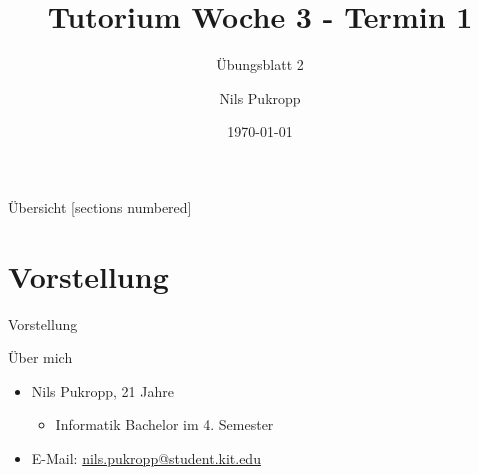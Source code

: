 \documentclass[aspectratio=169]{beamer}
\title{\color{classcolor}Tutorium Woche 3 - Termin 1}
\subtitle{Übungsblatt 2}
\date{\today}
\author{Nils Pukropp}
\institute{INSTITUT FÜR PROGRAMMSTRUKTUREN UND DATENORGANISATION}
\begin{document}
\maketitle

\begin{frame}{Übersicht}
  [sections numbered]
  \tableofcontents[hideallsubsections]
\end{frame}

\section{Vorstellung}
\begin{frame}[fragile]{Vorstellung}
  \begin{block}{Über mich}
  \begin{itemize}
    \item Nils Pukropp, 21 Jahre
    \begin{itemize}
      \item Informatik Bachelor im 4. Semester
    \end{itemize}
    \item E-Mail: \href{mailto:nils.pukropp@student.kit.edu}{nils.pukropp@student.kit.edu}
  \end{itemize}
\end{block}
\end{frame}
\end{document}
